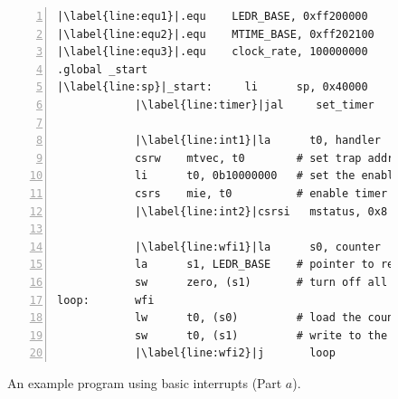 \documentclass[11pt, twoside, pdftex]{article}
\begin{document}
\begin{figure}[h]
\begin{center} \begin{minipage}[h]{15 cm}
\begin{lstlisting}[style=defaultNiosVStyle, name=ints, numbers=left, escapechar=|]
|\label{line:equ1}|.equ    LEDR_BASE, 0xff200000
|\label{line:equ2}|.equ    MTIME_BASE, 0xff202100
|\label{line:equ3}|.equ    clock_rate, 100000000
.global _start
|\label{line:sp}|_start:     li      sp, 0x40000      # initialize the stack location
            |\label{line:timer}|jal     set_timer        # initialize the timer
     
            |\label{line:int1}|la      t0, handler
            csrw    mtvec, t0        # set trap address
            li      t0, 0b10000000   # set the enable pattern
            csrs    mie, t0          # enable timer interrupts
            |\label{line:int2}|csrsi   mstatus, 0x8     # enable global interrupts

            |\label{line:wfi1}|la      s0, counter      # pointer to counter
            la      s1, LEDR_BASE    # pointer to red lights
            sw      zero, (s1)       # turn off all lights
loop:       wfi
            lw      t0, (s0)         # load the counter value
            sw      t0, (s1)         # write to the lights
            |\label{line:wfi2}|j       loop
\end{lstlisting}
	\caption{An example program using basic interrupts (Part $a$).}
	\label{fig:ints}
\end{minipage}
\end{center}
\end{figure}
\end{document}
